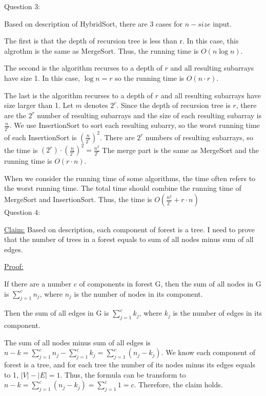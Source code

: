 \documentclass[12pt]{article}
\begin{document}
\pagebreak
\large Question 3: \vspace{5mm} \par
\normalsize 
\setlength{\baselineskip}{8mm}
Based on description of HybridSort, there are 3 cases for $n-size$ input.\par 
The first is that the depth of recursion tree is less than r. In this case, this algrothm is the same as MergeSort. Thus, the running time is $O(n\log{}{n})$. \par
The second is the algorithm recurses to a depth of $r$ and all resulting subarrays have size 1. In this case, $\log{}{n} = r$ so the running time is $O(n \cdot r)$. \par
The last is the algorithm recurses to a depth of $r$ and all resulting subarrays have size larger than 1. 
Let $m$ denotes $2^r$.
Since the depth of recursion tree is $r$,  there are the $2^r$ number of resulting subarrays and the size of each resulting subarray is $\frac{n}{2^r}$.
We use InsertionSort to sort each resulting subarry, so the worst running time of each InsertionSort is $(\frac{n}{2^r})^2$.
There are $2^r$ numbers of  resulting subarrays, so the time is $(2^r) \cdot (\frac{n}{2^r})^2 = \frac{n^2}{2^r} $
The merge part is the same as MergeSort and the running time is $O(r \cdot n)$.  \par
When we consider the running time of some algorithms, the time often refers to the worst running time. 
The total time should combine the running time of MergeSort and InsertionSort. Thus, the time is $O(\frac{n^2}{2^r} + r \cdot n)$\\


\pagebreak
\large Question 4: \vspace{5mm}\\
\normalsize 
\setlength{\baselineskip}{8mm}

\underline{Claim:} Based on description, each component of forest is a tree. I need to prove that the number of trees in a forest equals to sum of all nodes minus sum of all edges. \vspace{5mm}\par
\underline{Proof:} \par
If there are a number $c$ of components in forest G, then the sum of all nodes in G is $\sum_{j=1}^{c} {n_j} $, where ${n_j}$ is the number of nodes in its component. \par 
Then the sum of all edges in G is $\sum_{j=1}^{c} {k_j} $, where ${k_j}$ is the number of edges in its component. \par
The sum of all nodes minus sum of all edges is $ n - k = \sum_{j=1}^{c} {n_j} - \sum_{j=1}^{c} {k_j}  = \sum_{j=1}^{c} {(n_j - k_j)}$. 
We know each component of forest is a tree, and for each tree the number of its nodes minus its edges equals to 1, $|V| - |E| = 1$.
Thus, the formula can be transform to $n - k = \sum_{j=1}^{c} {(n_j - k_j)} = \sum_{j=1}^{c} 1 = c$.
Therefore, the claim holds.
\end{document}
